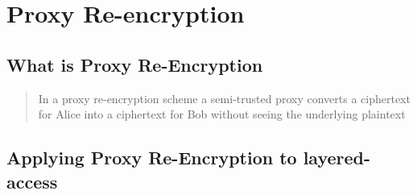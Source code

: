 \section{Proxy Re-encryption}

\subsection{What is Proxy Re-Encryption}

\blockquote{
  In a proxy re-encryption scheme a semi-trusted proxy converts a ciphertext for Alice into a ciphertext for Bob without seeing the underlying plaintext
}\autocite{greenateniese:2006:article}

\subsection{Applying Proxy Re-Encryption to layered-access}
